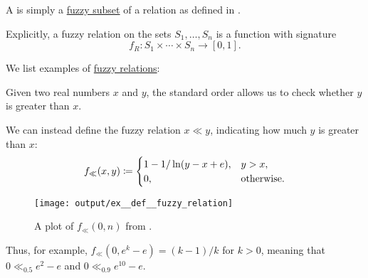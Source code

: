 \begin{definition}\label{def:fuzzy_relation}
  A  is simply a \hyperref[def:fuzzy_set]{fuzzy subset} of a relation as defined in .

  Explicitly, a fuzzy relation on the sets \( S_1, \ldots, S_n \) is a function with signature
  \begin{equation*}
    f_R: S_1 \times \cdots \times S_n \to [0, 1].
  \end{equation*}
\end{definition}

\begin{example}\label{ex:def:fuzzy_relation}
  We list examples of \hyperref[def:fuzzy_relation]{fuzzy relations}:
  \begin{thmenum}
     Given two real numbers \( x \) and \( y \), the standard order allows us to check whether \( y \) is greater than \( x \).

    We can instead define the fuzzy relation \( x \ll y \), indicating how much \( y \) is greater than \( x \):
    \begin{equation*}
      f_\ll(x, y) \coloneqq \begin{cases}
        1 - 1 / \ln(y - x + e), &y > x, \\
        0,                      &\T{otherwise.}
      \end{cases}
    \end{equation*}

    \begin{figure}[!ht]
      \centering
      \texttt{[image: output/ex\_\_def\_\_fuzzy\_relation]}
      \caption{A plot of \( f_\ll(0, n) \) from .}\label{fig:ex:ex:def:fuzzy_relation/leq}
    \end{figure}

    Thus, for example, \( f_\ll(0, e^k - e) = (k - 1) / k \) for \( k > 0 \), meaning that \( 0 \ll_{0.5} e^2 - e \) and \( 0 \ll_{0.9} e^{10} - e \).
  \end{thmenum}
\end{example}

